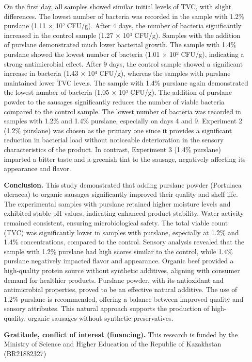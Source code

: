 \begin{multicols}{2}

On the first day, all samples showed similar initial levels of TVC, with
slight differences. The lowest number of bacteria was recorded in the
sample with 1.2\% purslane (1.11 × 10² CFU/g). After 4 days, the number
of bacteria significantly increased in the control sample (1.27 × 10³
CFU/g). Samples with the addition of purslane demonstrated much lower
bacterial growth. The sample with 1.4\% purslane showed the lowest
number of bacteria (1.01 × 10² CFU/g), indicating a strong antimicrobial
effect. After 9 days, the control sample showed a significant increase
in bacteria (1.43 × 10⁴ CFU/g), whereas the samples with purslane
maintained lower TVC levels. The sample with 1.4\% purslane again
demonstrated the lowest number of bacteria (1.05 × 10³ CFU/g). The
addition of purslane powder to the sausages significantly reduces the
number of viable bacteria compared to the control sample. The lowest
number of bacteria was recorded in samples with 1.2\% and 1.4\%
purslane, especially on days 4 and 9. Experiment 2 (1.2\% purslane) was
chosen as the primary one since it provides a significant reduction in
bacterial load without noticeable deterioration in the sensory
characteristics of the product. In contrast, Experiment 3 (1.4\%
purslane) imparted a bitter taste and a greenish tint to the sausage,
negatively affecting its appearance and flavor.

{\bfseries Conclusion.} This study demonstrated that adding purslane powder
(Portulaca oleracea) to organic sausages significantly improved their
quality and shelf life. The experimental samples with purslane retained
higher moisture levels and exhibited stable pH values, indicating
enhanced product stability. Water activity remained consistent, ensuring
microbiological safety. The total viable count (TVC) was significantly
lower in samples with purslane, especially at 1.2\% and 1.4\%
concentrations, compared to the control. Sensory analysis revealed that
the sample with 1.2\% purslane had high scores similar to the control,
while 1.4\% purslane negatively impacted flavor and appearance. Organic
beef provided a high-quality protein source without synthetic additives,
aligning with consumer demand for healthier products. Purslane powder,
with its antioxidant and antimicrobial properties, proved to be an
effective natural additive. The use of 1.2\% purslane is recommended,
offering a balance between improved quality and sensory attributes. This
natural approach supports the production of high-quality, organic
sausages without synthetic preservatives.

{\bfseries Gratitude, conflict of interest (financing).} This research is
funded by the Ministry of Science and Higher Education of the Republic
of Kazakhstan (BR21882327)

\end{multicols}


